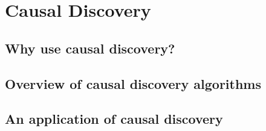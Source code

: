 \section{Causal Discovery}
\label{sec:causal-discovery}


\subsection{Why use causal discovery?}
\label{sec:why-causal-discovery}


\subsection{Overview of causal discovery algorithms}
\label{sec:discovery-overview}


\subsection{An application of causal discovery}
\label{sec:discovery-application}
